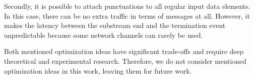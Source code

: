 Secondly, it is possible to attach punctuations to all regular input data elements. In this case, there can be no extra traffic in terms of messages at all. However, it makes the latency between the substream end and the termination event unpredictable because some network channels can rarely be used.

Both mentioned optimization ideas have significant trade-offs and require deep theoretical and experimental research. Therefore, we do not consider mentioned optimization ideas in this work, leaving them for future work.
